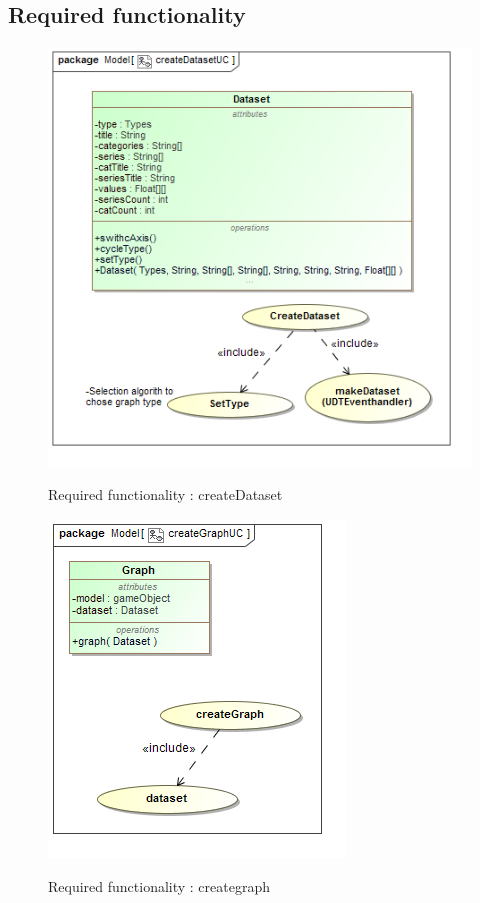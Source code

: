 \documentclass[a4paper,12pt]{article}
\begin{document}
\subsection{Required functionality}
	\begin{figure}[H]
		\includegraphics[width=\textwidth]{Images/createDatasetUC.png}  \\
		\caption{Required functionality : createDataset}
	\end{figure}
	\begin{figure}[H]
		\includegraphics[width=\textwidth]{Images/creategraphUC.png}  \\
		\caption{Required functionality : creategraph}
	\end{figure}
\end{document}
